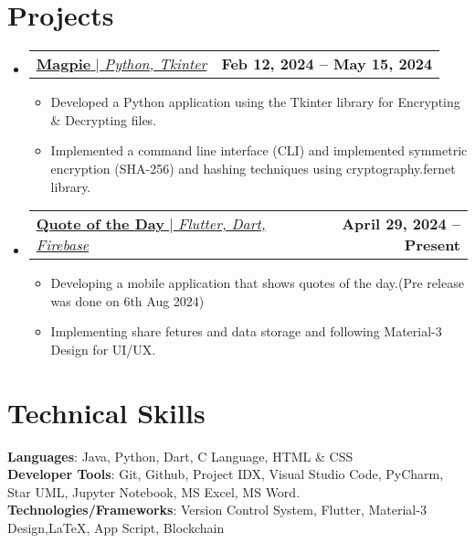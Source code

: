 \documentclass[a4paper,11pt]{article}
\makeatletter
\newcommand{\resumeItem}[1]{
  \item\small{
    {#1 \vspace{-2pt}}
  }
}
\newcommand{\resumeProjectHeading}[2]{
    \item
    \begin{tabular*}{0.97\textwidth}{l@{\extracolsep{\fill}}r}
      \small#1 & \textbf{\small #2} \\
    \end{tabular*}\vspace{-7pt}
}
\newcommand{\resumeSubHeadingListStart}{\begin{itemize}[leftmargin=0.15in, label={}]}
\newcommand{\resumeSubHeadingListEnd}{\end{itemize}}
\newcommand{\resumeItemListStart}{\begin{itemize}}
\newcommand{\resumeItemListEnd}{\end{itemize}\vspace{-5pt}}
\makeatother
\begin{document}
\section{Projects}
    \resumeSubHeadingListStart
      \resumeProjectHeading
          {\href{https://github.com/srinu2003/Magpie}{{\textbf{Magpie}} $|$ \emph{Python, Tkinter}}}{Feb 12, 2024 -- May 15, 2024}
          \resumeItemListStart \vspace{0pt}
          \resumeItem{Developed a Python application using the Tkinter library for Encrypting \& Decrypting files.}
          \resumeItem{Implemented a command line interface (CLI) and implemented symmetric encryption (SHA-256) and hashing techniques using cryptography.fernet library.}
          \resumeItemListEnd
      \resumeProjectHeading
        {\href{https://github.com/srinu2003/quote_of_the_day}{{\textbf{Quote of the Day}} $|$ \emph{Flutter, Dart, Firebase}}}{April 29, 2024 -- Present}
        \resumeItemListStart
          \resumeItem{Developing a mobile application that shows quotes of the day.(Pre release was done on 6th Aug 2024)}
          \resumeItem{Implementing share fetures and data storage and following Material-3 Design for UI/UX.}
        \resumeItemListEnd
    \resumeSubHeadingListEnd



\section{Technical Skills}
 \begin{itemize}[leftmargin=0.15in, label={}]
    \small{\item{
     \textbf{Languages}{: Java, Python, Dart, C Language, HTML \& CSS} \\
     \textbf{Developer Tools}{: Git, Github, Project IDX, Visual Studio Code, PyCharm, Star UML, Jupyter Notebook, MS Excel, MS Word.} \\
     \textbf{Technologies/Frameworks}{: Version Control System, Flutter, Material-3 Design,\LaTeX, App Script, Blockchain} \\
    }}
 \end{itemize}

\vspace{-12pt}
\end{document}
